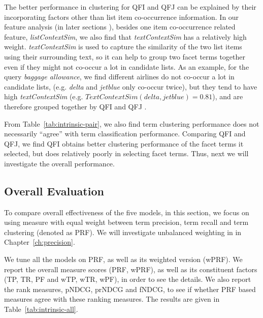 The better performance in clustering for QFI and QFJ can be explained by their incorporating factors other than list item co-occurrence information. In our feature analysis (in later sections ), besides one item co-occurrence related feature, \textit{listContextSim}, we also find that \textit{textContextSim} has a relatively high weight. \textit{textContextSim} is used to capture the similarity of the two list items using their surrounding text, so it can help to group two facet terms together even if they might not co-occur a lot in candidate lists. As an example, for the query \textit{baggage allowance}, we find different airlines do not co-occur a lot in candidate lists, (e.g. \textit{delta} and \textit{jetblue} only co-occur twice), but they tend to have high \textit{textContextSim} (e.g. $TextContextSim(delta,jetblue)=0.81$), and are therefore grouped together by QFI and QFJ .

From Table~\ref{tab:intrinsic-pair}, we also find term clustering performance does not necessarily ``agree'' with term classification performance. Comparing QFI and QFJ, we find QFI obtains better clustering performance of the facet terms it selected, but does relatively poorly in selecting facet terms. Thus, next we will investigate the overall performance.


\subsection{Overall Evaluation}
To compare overall effectiveness of the five models, in this section, we focus on using \PRF measure with equal weight between term precision, term recall and term clustering (denoted as PRF). We will investigate unbalanced weighting in \PRF in Chapter~\ref{ch:precision}.


We tune all the models on PRF, as well as its weighted version (wPRF). We report the overall measure scores (PRF, wPRF), as well as its constituent factors (TP, TR, PF and wTP, wTR, wPF), in order to see the details. We also report the rank measures, pNDCG, prNDCG and fNDCG, to see if whether PRF based measures agree with these ranking measures. The results are given in Table~\ref{tab:intrinsic-all}.

